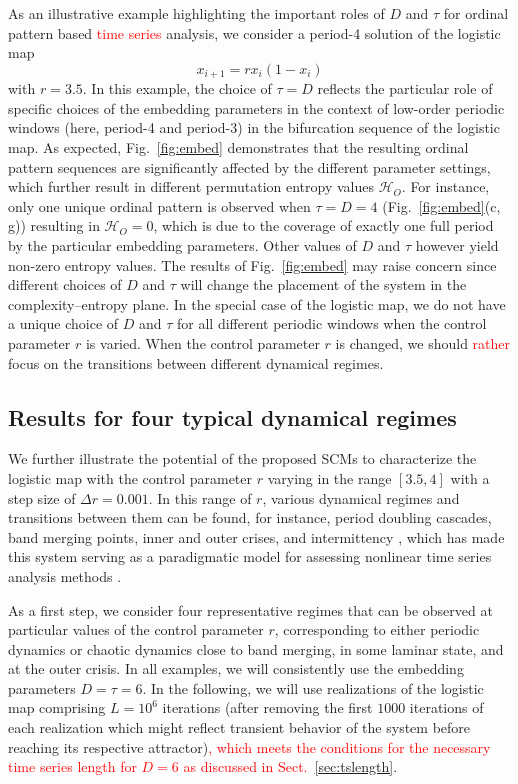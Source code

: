 \documentclass[aip,cha,reprint,nofootinbib]{revtex4-1}
\begin{document}
As an illustrative example highlighting the important roles of $D$ and $\tau$ for ordinal pattern based \textcolor{red}{time series} analysis, we consider a period-4 solution of the logistic map 
\begin{equation}
x_{i+1}=rx_i(1-x_i) 
\end{equation}
\noindent
with $r= 3.5$. {\color{red}In this example, the choice of $\tau = D$ reflects the particular role of specific choices of the embedding parameters in the context of low-order periodic windows (here, period-4 and period-3) in the bifurcation sequence of the logistic map. As expected,} Fig.~\ref{fig:embed} demonstrates that the resulting ordinal pattern sequences are significantly affected by the different parameter settings, which further result in different permutation entropy values $\mathcal{H}_O$. For instance, only one unique ordinal pattern is observed when $\tau = D = 4$ (Fig.~\ref{fig:embed}(c, g)) resulting in $\mathcal{H}_O = 0$, which is due to the coverage of exactly one full period by the particular embedding parameters. Other values of $D$ and $\tau$ however yield non-zero entropy values. The results of Fig.~\ref{fig:embed} may raise concern since different choices of $D$ and $\tau$ will change the placement of the system in the complexity--entropy plane. In the special case of the logistic map, we do not have a unique choice of $D$ and $\tau$ for {\color{red}all different} periodic windows when the control parameter $r$ is varied. When the control parameter $r$ is changed, we should \textcolor{red}{rather} focus on the transitions between different dynamical regimes. 

\subsection{Results for four typical dynamical regimes} \label{sec:four}
We further illustrate the potential of the proposed SCMs to characterize the logistic map with the control parameter $r$ varying in the range $[3.5, 4]$ with a step size of $\Delta r = 0.001$. In this range of $r$, various dynamical regimes and transitions between them can be found, for instance, period doubling cascades, band merging points, inner and outer crises, and intermittency \cite{Kantz97}, which has made this system serving as a paradigmatic model for assessing nonlinear time series analysis methods \cite{MarwanPLA2009}. 

As a first step, we consider four representative regimes that can be observed at particular values of the control parameter $r$, corresponding to either periodic dynamics or chaotic dynamics close to band merging, in some laminar state, and at the outer crisis. In all examples, we will consistently use the embedding parameters $D = \tau = 6$. In the following, we will use realizations of the logistic map comprising $L = 10^6$ iterations (after removing the first $1000$ iterations of each realization which might reflect transient behavior of the system before reaching its respective attractor)\textcolor{red}{, which meets the conditions for the necessary time series length for $D=6$ as discussed in Sect.~\ref{sec:tslength}}. 
\end{document}
